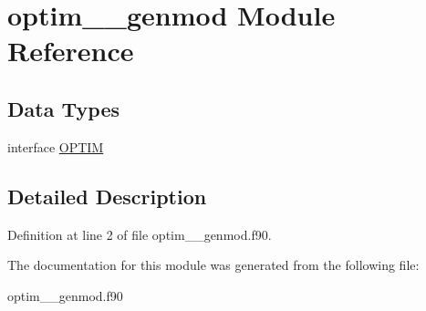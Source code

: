 \hypertarget{classoptim____genmod}{\section{optim\+\_\+\+\_\+genmod Module Reference}
\label{classoptim____genmod}
}
\subsection*{Data Types}
\begin{DoxyCompactItemize}
\item 
interface \hyperlink{interfaceoptim____genmod_1_1_o_p_t_i_m}{O\+P\+T\+I\+M}
\end{DoxyCompactItemize}


\subsection{Detailed Description}


Definition at line 2 of file optim\+\_\+\+\_\+genmod.\+f90.



The documentation for this module was generated from the following file\+:\begin{DoxyCompactItemize}
\item 
optim\+\_\+\+\_\+genmod.\+f90\end{DoxyCompactItemize}
